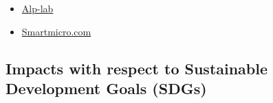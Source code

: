 \documentclass[
]{book}
\providecommand{\tightlist}{%
  \setlength{\itemsep}{0pt}\setlength{\parskip}{0pt}}
\begin{document}
\begin{itemize}
\tightlist
\item
  \href{https://www.alp-lab.at/}{Alp-lab}
\item
  \href{https://www.smartmicro.com/press-media/detail/smartmicro-sensors-deployed-in-austria}{Smartmicro.com}
\end{itemize}

\hypertarget{impacts-with-respect-to-sustainable-development-goals-sdgs-23}{%
\subsection*{Impacts with respect to Sustainable Development Goals (SDGs)}\label{impacts-with-respect-to-sustainable-development-goals-sdgs-23}}
\end{document}
